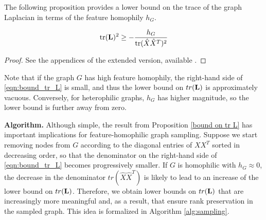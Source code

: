 

The following proposition provides a lower bound on the trace of the graph Laplacian in terms of the feature homophily $h_G$.

\begin{proposition}
    \label{bound on tr L}
    \begin{equation} \label{eqn:bound_tr_L}
        \text{tr}(\bbL)^2 \geq - \frac{h_G}{\text{tr}(\hat{X}\hat{X}^T)^2}
    \end{equation}
\end{proposition}
\begin{proof}
See the appendices of the extended version, available .
\end{proof}

Note that if the graph $G$ has high feature homophily, the right-hand side of \eqref{eqn:bound_tr_L} is small, and thus the lower bound on $tr({\mathbf L})$ is approximately vacuous. Conversely, for heterophilic graphs, $h_G$ has higher magnitude, so the lower bound is further away from zero.

\noindent \textbf{Algorithm.} Although simple, the result from Proposition \ref{bound on tr L} has important implications for feature-homophilic graph sampling. Suppose we start removing nodes from $G$ according to the diagonal entries of $X X^T$  sorted in decreasing order, so that the denominator on the right-hand side of \eqref{eqn:bound_tr_L} becomes progressively smaller. If $G$ is homophilic with $h_G \approx 0$, the decrease in the denominator $tr(\hat{X}\hat{X}^T)$ is likely to lead to an increase of the lower bound on $tr({\mathbf L})$. Therefore, we obtain lower bounds on $tr({\mathbf L})$ that are increasingly more meaningful and, as a result, that ensure rank preservation in the sampled graph. This idea is formalized in Algorithm \ref{alg:sampling}.

